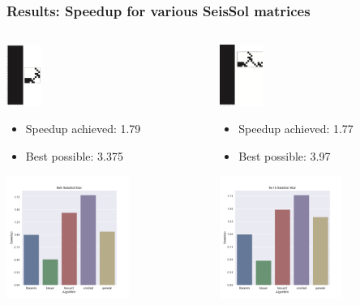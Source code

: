 \documentclass[9pt]{beamer}
\begin{document}
\begin{frame}[fragile]
  \frametitle{Results: Speedup for various SeisSol matrices}

  \begin{columns}[t]
    \begin{column}{0.3\textwidth}
      \centering
      \includegraphics[height=2cm]{images/star_small.png}
      \footnotesize
      \begin{itemize}
        \item Speedup achieved: 1.79
        \item Best possible: 3.375
      \end{itemize}
      \includegraphics[width=4cm]{images/seissol_comparison_9x9.pdf}
    \end{column}

    \begin{column}{0.3\textwidth}
      \centering
      \includegraphics[height=2cm]{images/star_medium.png}
      \footnotesize
      \begin{itemize}
        \item Speedup achieved: 1.77
        \item Best possible: 3.97
      \end{itemize}
      \includegraphics[width=4cm]{images/seissol_comparison_9x15.pdf}
    \end{column}


\end{columns}
\end{frame}
\end{document}
